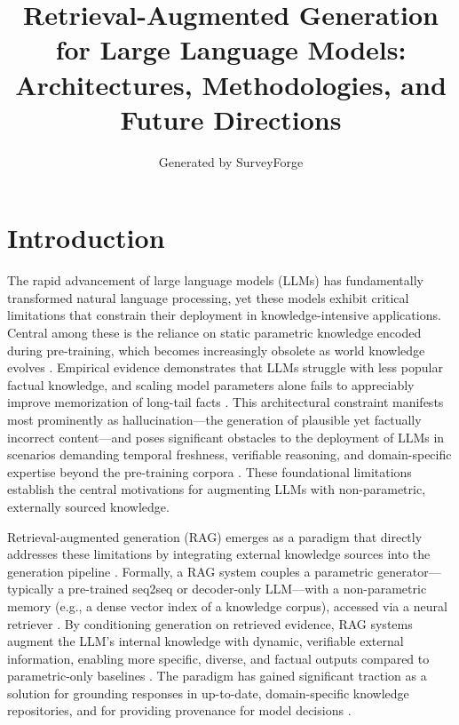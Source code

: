 \documentclass[11pt,a4paper]{article}
\title{Retrieval-Augmented Generation for Large Language Models: Architectures, Methodologies, and Future Directions}
\author{Generated by SurveyForge}
\date{}
\begin{document}
\maketitle
\tableofcontents
\newpage



\section{Introduction}


The rapid advancement of large language models (LLMs) has fundamentally transformed natural language processing, yet these models exhibit critical limitations that constrain their deployment in knowledge-intensive applications. Central among these is the reliance on static parametric knowledge encoded during pre-training, which becomes increasingly obsolete as world knowledge evolves \cite{arxiv:2312.10997v5,arxiv:2410.12837v1}. Empirical evidence demonstrates that LLMs struggle with less popular factual knowledge, and scaling model parameters alone fails to appreciably improve memorization of long-tail facts \cite{arxiv:2212.10511v4}. This architectural constraint manifests most prominently as hallucination---the generation of plausible yet factually incorrect content---and poses significant obstacles to the deployment of LLMs in scenarios demanding temporal freshness, verifiable reasoning, and domain-specific expertise beyond the pre-training corpora \cite{arxiv:2312.10997v5,arxiv:2506.00054v1}. These foundational limitations establish the central motivations for augmenting LLMs with non-parametric, externally sourced knowledge.

Retrieval-augmented generation (RAG) emerges as a paradigm that directly addresses these limitations by integrating external knowledge sources into the generation pipeline \cite{arxiv:2005.11401v4}. Formally, a RAG system couples a parametric generator---typically a pre-trained seq2seq or decoder-only LLM---with a non-parametric memory (e.g., a dense vector index of a knowledge corpus), accessed via a neural retriever \cite{arxiv:2005.11401v4}. By conditioning generation on retrieved evidence, RAG systems augment the LLM's internal knowledge with dynamic, verifiable external information, enabling more specific, diverse, and factual outputs compared to parametric-only baselines \cite{arxiv:2005.11401v4,arxiv:2305.06983v2}. The paradigm has gained significant traction as a solution for grounding responses in up-to-date, domain-specific knowledge repositories, and for providing provenance for model decisions \cite{arxiv:2403.03187v1,arxiv:2405.07437v2}.
\end{document}

